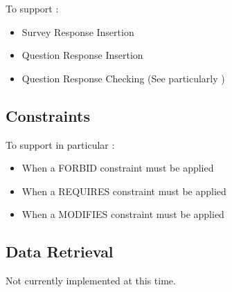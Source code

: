 \documentclass[10pt]{article}
\begin{document}
To support :

\begin{itemize}
\item Survey Response Insertion
\item Question Response Insertion
\item Question Response Checking (See particularly )
\end{itemize}

\subsection{Constraints}

To support in particular :

\begin{itemize}
\item When a FORBID constraint must be applied
\item When a REQUIRES constraint must be applied
\item When a MODIFIES constraint must be applied
\end{itemize}


\subsection{Data Retrieval}

Not currently implemented at this time.
\end{document}
